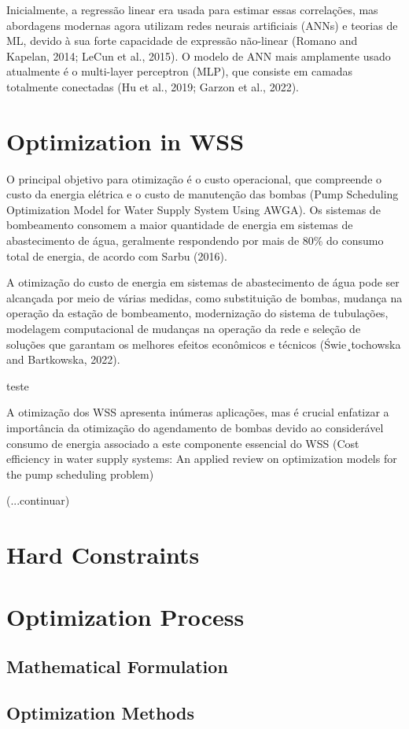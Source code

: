 Inicialmente, a regressão linear era usada para estimar essas correlações, mas abordagens modernas agora utilizam redes neurais artificiais (ANNs) e teorias de ML, devido à sua forte capacidade de expressão não-linear (Romano and Kapelan, 2014; LeCun et al., 2015). O modelo de ANN mais amplamente usado atualmente é o multi-layer perceptron (MLP), que consiste em camadas totalmente conectadas (Hu et al., 2019; Garzon et al., 2022).





\section{Optimization in WSS}

O principal objetivo para otimização é o custo operacional, que compreende o custo da energia elétrica e o custo de manutenção das bombas \cite{rfc2} (Pump Scheduling Optimization Model for Water Supply System Using AWGA). Os sistemas de bombeamento consomem a maior quantidade de energia em sistemas de abastecimento de água, geralmente respondendo por mais de 80\% do consumo total de energia, de acordo com Sarbu (2016).


A otimização do custo de energia em sistemas de abastecimento de água pode ser alcançada por meio de várias medidas, como substituição de bombas, mudança na operação da estação de bombeamento, modernização do sistema de tubulações, modelagem computacional de mudanças na operação da rede e seleção de soluções que garantam os melhores efeitos econômicos e técnicos (Świe¸tochowska and Bartkowska, 2022).


teste~\cite{rfc1}

A otimização dos WSS apresenta inúmeras aplicações, mas é crucial enfatizar a importância da otimização do agendamento de bombas devido ao considerável consumo de energia associado a este componente essencial do WSS (Cost efficiency in water supply systems: An applied review on optimization models for the pump scheduling problem)

(...continuar)

\section{Hard Constraints}

\section{Optimization Process}

\subsection{Mathematical Formulation}

\subsection{Optimization Methods}

